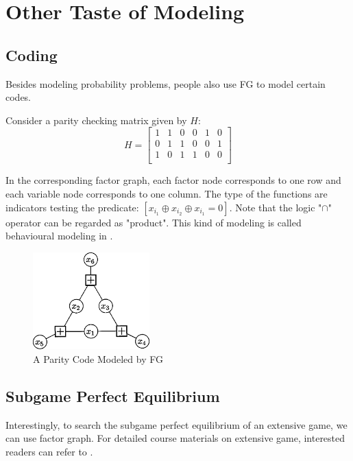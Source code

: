 \section{Other Taste of Modeling}

\subsection{Coding}

Besides modeling probability problems, people also use FG to 
model certain codes. 

Consider a parity checking matrix given by $H$:
\begin{equation}
	H = \left[
	\begin{matrix}
		1 & 1 & 0 & 0 & 1 & 0 \\
0 & 1 & 1 & 0 & 0 & 1 \\
1 & 0 & 1 & 1 & 0 & 0 \\
	\end{matrix}
	\right]
\end{equation}

In the corresponding factor graph, each factor node corresponds
to one row and each variable node corresponds to one column. The 
type of the functions are indicators testing the predicate:
$[x_{i_1} \oplus x_{i_2} \oplus x_{i_1} = 0]$. Note that 
the logic "$\cap$" operator can be regarded as "product". 
This kind of modeling is called behavioural modeling in 
\cite{kschischang2001factor}. 

\begin{figure}[htb]
\centering
	\includegraphics[width=0.4\textwidth]{fig/kschischang2001-parity}
	\caption{A Parity Code Modeled by FG\cite{kschischang2001factor}}
\end{figure}


\subsection{Subgame Perfect Equilibrium}

Interestingly, to search the subgame perfect equilibrium of 
an extensive game, we can use factor graph. For detailed 
course materials on extensive game, interested readers can 
refer to \cite{osborne1994course}. 

